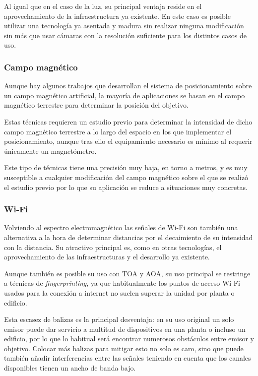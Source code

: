 Al igual que en el caso de la luz, su principal ventaja reside en el aprovechamiento de la infraestructura ya existente.
En este caso es posible utilizar una tecnología ya asentada y madura sin realizar ninguna modificación sin más que usar cámaras con la resolución suficiente para los distintos casos de uso.

\subsubsection{Campo magnético}

Aunque hay algunos trabajos que desarrollan el sistema de posicionamiento sobre un campo magnético artificial, la mayoría de aplicaciones se basan en el campo magnético terrestre para determinar la posición del objetivo.

Estas técnicas requieren un estudio previo para determinar la intensidad de dicho campo magnético terrestre a lo largo del espacio en los que implementar el posicionamiento, aunque tras ello el equipamiento necesario es mínimo al requerir únicamente un magnetómetro.

Este tipo de técnicas tiene una precisión muy baja, en torno a metros, y es muy susceptible a cualquier modificación del campo magnético sobre el que se realizó el estudio previo por lo que su aplicación se reduce a situaciones muy concretas.

\subsubsection{Wi-Fi}

Volviendo al espectro electromagnético las señales de Wi-Fi son también una alternativa a la hora de determinar distancias por el decaimiento de su intensidad con la distancia. 
Su atractivo principal es, como en otras tecnologías, el aprovechamiento de las infraestructuras y el desarrollo ya existente.

Aunque también es posible su uso con TOA y AOA, su uso principal se restringe a técnicas de \textit{fingerprinting}, ya que habitualmente los puntos de acceso Wi-Fi usados para la conexión a internet no suelen superar la unidad por planta o edificio.

Esta escasez de balizas es la principal desventaja: en su uso original un solo emisor puede dar servicio a multitud de dispositivos en una planta o incluso un edificio, por lo que lo habitual será encontrar numerosos obstáculos entre emisor y objetivo.
Colocar más balizas para mitigar esto no solo es caro, sino que puede también añadir interferencias entre las señales teniendo en cuenta que los canales disponibles tienen un ancho de banda bajo.

